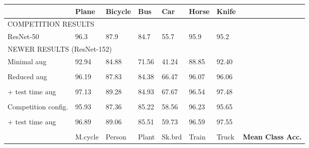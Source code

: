 \documentclass{article}
\begin{document}
\begin{table}[!t]
\begin{center}
\footnotesize
\begin{tabular}{llllllll}
\hline
\hline
{}                                       & Plane & Bicycle & Bus & Car & Horse & Knife & \\
\hline
\hline

\multicolumn{8}{l}{COMPETITION RESULTS} \\

\rule{0pt}{2.5ex}ResNet-50        & 96.3      & 87.9      & 84.7      & 55.7      & 95.9      & 95.2 & \\

\hline

\multicolumn{8}{l}{NEWER RESULTS (ResNet-152)} \\

\rule{0pt}{2.5ex}Minimal aug        & 92.94     & 84.88     & 71.56     & 41.24     & 88.85     & 92.40     & \\
                                    &   &   &   &   &   &   & \\


\rule{0pt}{2.5ex}Reduced aug        & 96.19     & 87.83     & 84.38     & 66.47     & 96.07     & 96.06     & \\
                                    &   &   &   &   &   &   & \\

\rule{0pt}{2.5ex}+ test time aug    & 97.13     & 89.28     & 84.93     & 67.67     & 96.54     & 97.48     & \\
                                    &   &   &   &   &   &   & \\


\rule{0pt}{2.5ex}Competition config.& 95.93     & 87.36     & 85.22     & 58.56     & 96.23     & 95.65     & \\
                                    &   &   &   &   &   &   & \\

\rule{0pt}{2.5ex}+ test time aug    & 96.89     & 89.06     & 85.51     & 59.73     & 96.59     & 97.55     & \\
                                    &   &   &   &   &   &   & \\



\hline
\hline

\hline
\hline
{}                  & M.cycle     & Person    & Plant     & Sk.brd    & Train     & Truck     & \textbf{Mean Class Acc.} \\
\hline
\hline


\end{tabular}
\end{center}
\end{table}
\end{document}
